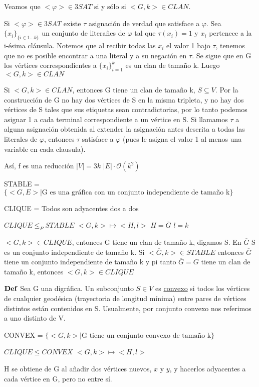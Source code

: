 \documentclass{homework}
\begin{document}
Veamos que $<\varphi> \in 3SAT$ si y sólo si $<G,k> \in CLAN$.

Si $<\varphi> \in 3SAT$ existe $\tau$ asignación de verdad que satisface a $\varphi$. Sea $\{x_i\}_{\{i \in 1 ... k\}}$ un conjunto de literañes de $\varphi$ tal que $\tau (x_i) = 1$ y $x_i$ pertenece a la i-ésima cláusula. Notemos que al recibir todas las $x_i$ el valor 1 bajo $\tau$, tenemos que no es posible encontrar a una literal y a su negación en $\tau$. Se sigue que en G los vértices correspondientes a $\{x_i\}_{i=1}^{k}$ es un clan de tamaño k. Luego $<G,k> \in CLAN$

Si $<G,k> \in CLAN$, entonces G tiene un clan de tamaño k, $S \subseteq V$. Por la construcción de G no hay dos vértices de S en la misma tripleta, y no hay dos vértices de S tales que sus etiquetas sean contradictorias, por lo tanto podemos asignar 1 a cada terminal correspondiente a un vértice en S. Si llamamos $\tau$ a alguna asignación obtenida al extender la asignación antes descrita a todas las literales de $\varphi$, entonces $\tau$ satisface a $\varphi$ (pues le asigna el valor 1 al menos una variable en cada clausula).

Así, f es una reducción
$|V| = 3k$
$|E| \cdot \mathcal{O}(k^2)$

STABLE = $\{<G,E> | \text{G es una gráfica con un conjunto independiente de tamaño k}\}$

CLIQUE = Todos son adyacentes dos a dos

$CLIQUE \leq_P STABLE$
$ <G,k> \mapsto <H,l>$
$H = \overline{G}$
$l = k$


$<G,k> \in CLIQUE$, entonces G tiene un clan de tamaño k, digamos S. En $\overline{G}$ S es un conjunto independiente de tamaño k. Si $<\overline{G},k> \in STABLE$ entonces $\overline{G}$ tiene un conjunto independiente de tamaño k y pi tanto $\overline{G} = G$ tiene un clan de tamaño k, entonces $<G,k> \in CLIQUE$

$\bf{Def}$ Sea G una digráfica. Un subconjunto $S\in V$ es \underline{convexo} si todos los vértices de cualquier geodésica (trayectoria de longitud mínima) entre pares de vértices distintos están contenidos en S. Usualmente, por conjunto convexo nos referimos a uno distinto de V.

CONVEX = $\{<G,k>| \text{G tiene un conjunto convexo de tamaño k}\}$

$CLIQUE \leq CONVEX$
$<G,k> \mapsto <H,l>$

H se obtiene de G al añadir dos vértices nuevos, $x$ y $y$, y hacerlos adyacentes a cada vértice en G, pero no entre sí.
\end{document}
